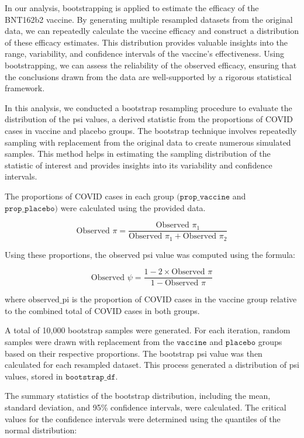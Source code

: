 \documentclass[
  11pt,
]{article}
\begin{document}
In our analysis, bootstrapping is applied to estimate the efficacy of
the BNT162b2 vaccine. By generating multiple resampled datasets from the
original data, we can repeatedly calculate the vaccine efficacy and
construct a distribution of these efficacy estimates. This distribution
provides valuable insights into the range, variability, and confidence
intervals of the vaccine's effectiveness. Using bootstrapping, we can
assess the reliability of the observed efficacy, ensuring that the
conclusions drawn from the data are well-supported by a rigorous
statistical framework.

In this analysis, we conducted a bootstrap resampling procedure to
evaluate the distribution of the psi values, a derived statistic from
the proportions of COVID cases in vaccine and placebo groups. The
bootstrap technique involves repeatedly sampling with replacement from
the original data to create numerous simulated samples. This method
helps in estimating the sampling distribution of the statistic of
interest and provides insights into its variability and confidence
intervals.

The proportions of COVID cases in each group \((\texttt{prop_vaccine}\)
and \(\texttt{prop_placebo})\) were calculated using the provided data.

\[ \text{Observed }\pi = \frac{\text{Observed }\pi_1}{\text{Observed }\pi_1 + \text{Observed }\pi_2} \]

Using these proportions, the observed psi value was computed using the
formula:

\[\text{Observed } \psi = \frac{1 - 2 \times \text{Observed } \pi}{1 - \text{Observed } \pi}\]

where \(\text{observed_pi}\) is the proportion of COVID cases in the
vaccine group relative to the combined total of COVID cases in both
groups.

A total of 10,000 bootstrap samples were generated. For each iteration,
random samples were drawn with replacement from the \(\texttt{vaccine}\)
and \(\texttt{placebo}\) groups based on their respective proportions.
The bootstrap psi value was then calculated for each resampled dataset.
This process generated a distribution of psi values, stored in
\(\texttt{bootstrap_df}\).

The summary statistics of the bootstrap distribution, including the
mean, standard deviation, and 95\% confidence intervals, were
calculated. The critical values for the confidence intervals were
determined using the quantiles of the normal distribution:
\end{document}
